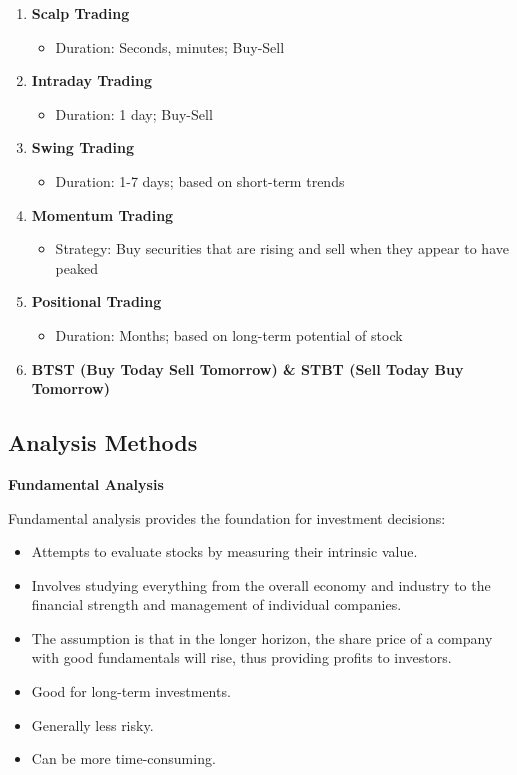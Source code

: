 \documentclass[12pt]{article}
\begin{document}
\begin{enumerate}
\item \textbf{Scalp Trading}
    \begin{itemize}
    \item Duration: Seconds, minutes; Buy-Sell
    \end{itemize}

\item \textbf{Intraday Trading}
    \begin{itemize}
    \item Duration: 1 day; Buy-Sell
    \end{itemize}

\item \textbf{Swing Trading}
    \begin{itemize}
    \item Duration: 1-7 days; based on short-term trends
    \end{itemize}

\item \textbf{Momentum Trading}
    \begin{itemize}
    \item Strategy: Buy securities that are rising and sell when they appear to have peaked
    \end{itemize}

\item \textbf{Positional Trading}
    \begin{itemize}
    \item Duration: Months; based on long-term potential of stock
    \end{itemize}

\item \textbf{BTST (Buy Today Sell Tomorrow) \& STBT (Sell Today Buy Tomorrow)}
\end{enumerate}

\subsection{Analysis Methods}

\textbf{Fundamental Analysis}

Fundamental analysis provides the foundation for investment decisions:
\begin{itemize}
\item Attempts to evaluate stocks by measuring their intrinsic value.
\item Involves studying everything from the overall economy and industry to the financial strength and management of individual companies.
\item The assumption is that in the longer horizon, the share price of a company with good fundamentals will rise, thus providing profits to investors.
\item Good for long-term investments.
\item Generally less risky.
\item Can be more time-consuming.
\end{itemize}
\end{document}
